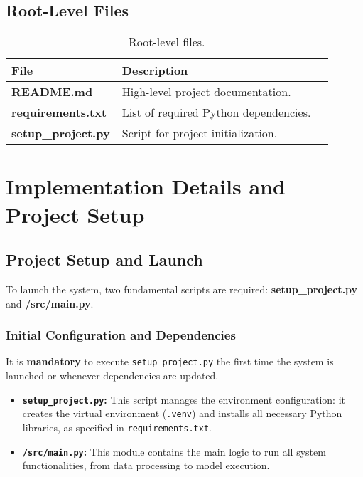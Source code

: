 \documentclass[12pt,a4paper]{article}
\begin{document}
\subsection{Root-Level Files}

\begin{table}[H]
\centering
\renewcommand{\arraystretch}{1.2}
\begin{tabular}{p{0.25\linewidth} p{0.65\linewidth}}
\toprule
\textbf{File} & \textbf{Description} \\
\midrule
\textbf{README.md} & High-level project documentation. \\
\textbf{requirements.txt} & List of required Python dependencies. \\
\textbf{setup\_project.py} & Script for project initialization. \\
\bottomrule
\end{tabular}
\caption{Root-level files.}
\end{table}


\section{Implementation Details and Project Setup}

\subsection{Project Setup and Launch}

To launch the system, two fundamental scripts are required: \textbf{setup\_project.py} and \textbf{/src/main.py}.

\subsubsection{Initial Configuration and Dependencies}

It is \textbf{mandatory} to execute \texttt{setup\_project.py} the first time the system is launched or whenever dependencies are updated.
\begin{itemize}
    \item \textbf{\texttt{setup\_project.py}:} This script manages the environment configuration: it creates the virtual environment (\texttt{.venv}) and installs all necessary Python libraries, as specified in \texttt{requirements.txt}.
    \item \textbf{\texttt{/src/main.py}:} This module contains the main logic to run all system functionalities, from data processing to model execution.
\end{itemize}
\end{document}
